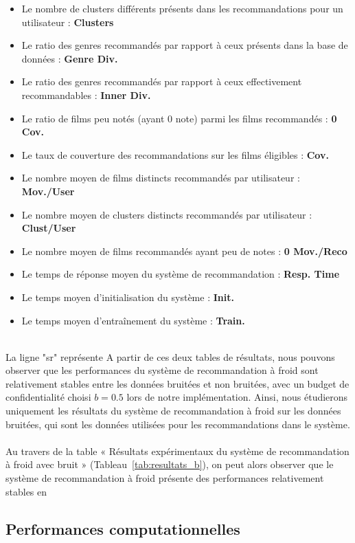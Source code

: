 \documentclass{article}
\begin{document}
    \begin{itemize}
    \item Le nombre de clusters différents présents dans les recommandations pour un utilisateur : \textbf{Clusters}
    \item Le ratio des genres recommandés par rapport à ceux présents dans la base de données : \textbf{Genre Div.}
    \item Le ratio des genres recommandés par rapport à ceux effectivement recommandables : \textbf{Inner Div.}
    \item Le ratio de films peu notés (ayant 0 note) parmi les films recommandés : \textbf{0 Cov.}
    \item Le taux de couverture des recommandations sur les films éligibles : \textbf{Cov.}
    \item Le nombre moyen de films distincts recommandés par utilisateur : \textbf{Mov./User}
    \item Le nombre moyen de clusters distincts recommandés par utilisateur : \textbf{Clust/User}
    \item Le nombre moyen de films recommandés ayant peu de notes : \textbf{0 Mov./Reco}
    \item Le temps de réponse moyen du système de recommandation : \textbf{Resp. Time}
    \item Le temps moyen d’initialisation du système : \textbf{Init.}
    \item Le temps moyen d’entraînement du système : \textbf{Train.}
    \end{itemize}
    $ $\\
    La ligne "sr" représente
    A partir de ces deux tables de résultats, nous pouvons observer que les performances du système de recommandation à 
    froid sont relativement stables entre les données bruitées et non bruitées, avec un budget de confidentialité choisi 
    $b=0.5$ lors de notre implémentation. Ainsi, nous étudierons uniquement les résultats du système de recommandation à froid sur les données bruitées, qui sont 
    les données utilisées pour les recommandations dans le système.\\
    \\
    Au travers de la table « Résultats expérimentaux du système de recommandation à froid avec bruit » (Tableau~\ref{tab:resultats_b}), 
    on peut alors observer que le système de recommandation à froid présente des performances relativement stables en 




    \subsection{Performances computationnelles}
\end{document}
